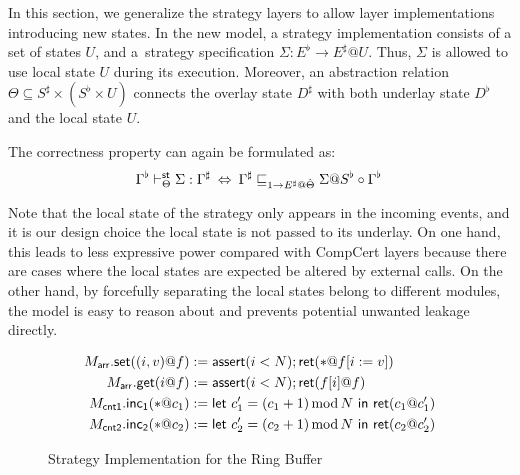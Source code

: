 \documentclass[acmsmall,review,anonymous]{acmart}\settopmatter{printfolios=true,printccs=false,printacmref=false}
\begin{document}

In this section,
we generalize the strategy layers
to allow layer implementations
introducing new states.
In the new model,
a strategy implementation consists of
a set of states $U$,
and a~strategy specification $\Sigma : E^\flat \rightarrow E^\sharp @U$.
Thus, $\Sigma$ is allowed to
use local state $U$ during its execution.
Moreover, an abstraction relation
$\Theta \subseteq S^\sharp \times (S^\flat \times U)$
connects the overlay state $D^\sharp$
with both underlay state $D^\flat$
and the local state $U$.

The correctness property can again be formulated as:
\[
  \Gamma^\flat \vdash^\kw{st}_\Theta \Sigma : \Gamma^\sharp
  \:\Leftrightarrow\:
  \Gamma^\sharp \sqsubseteq_{1 \rightarrow E^\sharp@\hat{\Theta}}
  \Sigma@S^\flat \circ \Gamma^\flat
  \,
\]

Note that
the local state of the strategy
only appears in the incoming events,
and it is our design choice
the local state is not passed
to its underlay.
On one hand, this leads to less expressive power
compared with CompCert layers
because there are cases
where the local states are expected be altered
by external calls.
On the other hand, by forcefully separating
the local states belong to different modules,
the model is easy to reason about
and prevents potential unwanted leakage directly.

\begin{figure*}
  \centering
  \begin{align*}
    M_\kw{arr}.\kw{set}((i,v)@f)
    & := \kw{assert}(i < N); \kw{ret}(*@f[i:=v])\\
    M_\kw{arr}.\kw{get}(i@f)
    & := \kw{assert}(i < N); \kw{ret}(f[i]@f)\\
    M_\kw{cnt1}.\kw{inc_1}(*@c_1)
    &:= \kw{let}\ c'_1 = (c_1+1)\mathop{\mathrm{mod}} N\ \kw{in}\ \kw{ret}(c_1@c'_1)\\
    M_\kw{cnt2}.\kw{inc_2}(*@c_2)
    & := \kw{let}\ c'_2 = (c_2+1)\mathop{\mathrm{mod}} N\ \kw{in}\ \kw{ret}(c_2@c'_2)
  \end{align*}
  \caption{Strategy Implementation for the Ring Buffer}
  \label{fig:mrb}
\end{figure*}
\end{document}
